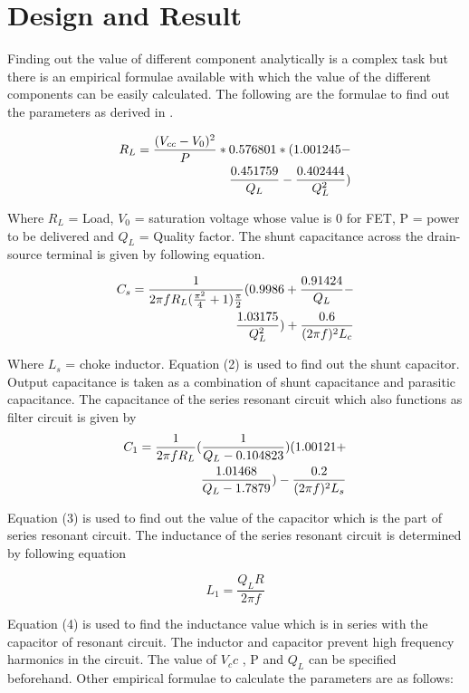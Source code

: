 \documentclass[journal,twoside]{IEEEtran}
\begin{document}
\section{Design and Result}

Finding out the value of different component analytically is a
complex task but there is an empirical formulae available with
which the value of the different components can be easily
calculated. The following are the formulae to find out the
parameters as derived in \cite{Sokal2001}.

\begin{align}
R_L= \frac{(V_{cc}-V_0)^
2}{P}*0.576801*(1.001245-\notag
\\ \qquad \frac{0.451759}{Q_L}-\frac{0.402444}{Q_L^2})
\end{align}

\bigskip

Where $R_L$ = Load, $V_0$ = saturation voltage whose value is 0
for FET, P = power to be delivered and $Q_L$ = Quality factor.
The shunt capacitance across the drain-source terminal is
given by following equation.

\begin{align}
C_s= \frac{1}{2\pi fR_L(\frac{\pi ^2}{4}+1)\frac{\pi}{2}}(0.9986+ \frac{0.91424}{Q_L}-\notag\\ \qquad\frac{1.03175}{Q_L^2}) +\frac{0.6}{(2\pi f)^2L_c}
\end{align}

\bigskip

Where $L_s$ = choke inductor. Equation (2) is used to find out
the shunt capacitor. Output capacitance is taken as a
combination of shunt capacitance and parasitic capacitance.
The capacitance of the series resonant circuit which also
functions as filter circuit is given by
\begin{align}
C_1=\frac{1}{2\pi fR_L}(\frac{1}{Q_L-0.104823})(1.00121+\notag\\\qquad\qquad\frac{1.01468}{Q_L-1.7879})-\frac{0.2}{(2\pi f)^2L_s}
\end{align}


\bigskip
Equation (3) is used to find out the value of the capacitor
which is the part of series resonant circuit. The inductance of
the series resonant circuit is determined by following equation

\begin{equation}
L_1=\frac{Q_LR}{2\pi f}
\end{equation}

\bigskip
Equation (4) is used to find the inductance value which is in
series with the capacitor of resonant circuit. The inductor and
capacitor prevent high frequency harmonics in the circuit.
The value of $V_cc$ , P and $Q_L$ can be specified beforehand.
Other empirical formulae to calculate the parameters are as
follows:
\end{document}
